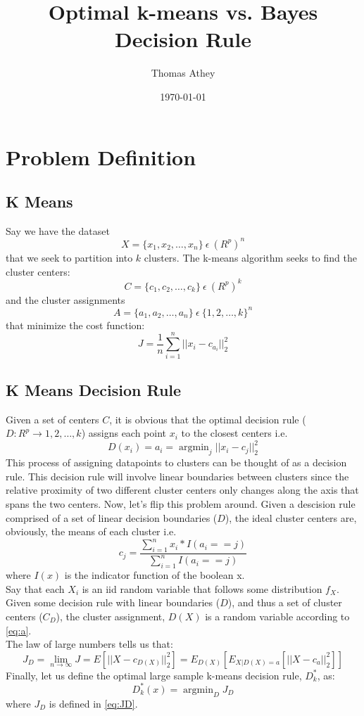 \documentclass{article}
\title{Optimal k-means vs. Bayes Decision Rule}
\author{Thomas Athey}
\date\today
\DeclareMathOperator*{\argmin}{argmin}
\begin{document}
\maketitle
\section{Problem Definition}

\subsection{K Means}
Say we have the dataset \[ X=\{x_1,x_2,\ldots,x_n\} \: \epsilon \: (R^p)^n \] that we seek to partition into $k$ clusters. The k-means algorithm seeks to find the cluster centers:\\
\[C=\{c_1,c_2,\ldots,c_k\} \: \epsilon \: (R^p)^k\]
and the cluster assignments 
\[ A = \{ a_1,a_2,\ldots,a_n\} \: \epsilon \: \{1,2,\ldots,k\}^n \]
that minimize the cost function:
\[ J = \frac{1}{n} \sum\limits_{i=1}^n ||x_i - c_{a_i} ||_2^2\]

\subsection {K Means Decision Rule}
Given a set of centers $C$, it is obvious that the optimal decision rule ($D:R^p \to {1,2,\ldots,k}$) assigns each point $x_i$ to the closest centers i.e.
\begin{equation}
\label{eq:a}
D(x_i) = a_i =\argmin_j   ||x_i - c_{j} ||_2^2
\end{equation}
\quad This process of assigning datapoints to clusters can be thought of as a decision rule. This decision rule will involve linear boundaries between clusters since the relative proximity of two different cluster centers only changes along the axis that spans the two centers. Now, let's flip this problem around. Given a descision rule comprised of a set of linear decision boundaries ($D$), the ideal cluster centers are, obviously, the means of each cluster i.e.
\[ c_j = \frac{ \sum\limits_{i=1}^n x_i*I(a_i == j)} {\sum\limits_{i=1}^n I(a_i == j)} \]
where $I(x)$ is the indicator function of the boolean x. \\
\null \quad Say that each $X_i$ is an iid random variable that follows some distribution $f_X$. Given some decision rule with linear boundaries ($D$), and thus a set of cluster centers ($C_D$), the cluster assignment, $D(X)$ is a random variable according to \ref{eq:a}. \\ \null \quad
The law of large numbers tells us that:
\begin{equation}
\label{eq:JD}
 J_D = \lim_{n\to\infty} J = E[||X - c_{D(X)}||_2^2] = E_{D(X)}[E_{X|D(X)=a}[||X - c_a||_2^2]]
\end{equation}
Finally, let us define the optimal large sample k-means decision rule, $D_k^*$, as:
\begin{equation}
\label{eq:Dk*}
D_k^*(x) = \argmin_D J_D 
\end{equation}
where $J_D$ is defined in \ref{eq:JD}.
\end{document}
